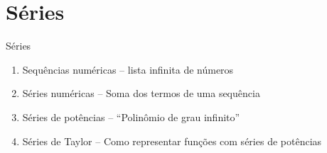 \section{Séries}

\begin{frame}{Séries}
  \begin{enumerate}[<+->]
    \item Sequências numéricas \tabto{40mm} -- lista infinita de números
    \item Séries numéricas     \tabto{40mm} -- Soma dos termos de uma sequência
    \item Séries de potências  \tabto{40mm} -- ``Polinômio de grau infinito''
    \item Séries de Taylor     \tabto{40mm} -- Como representar funções com séries de potências
  \end{enumerate}
\end{frame}

\begin{frame}
  \tableofcontents
\end{frame}


